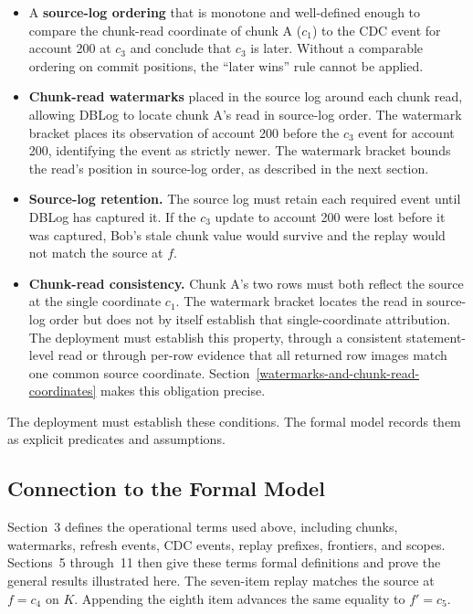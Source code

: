 \documentclass[letterpaper,10pt,twocolumn]{article}
\providecommand{\tightlist}{\setlength{\itemsep}{0pt}\setlength{\parskip}{0pt}}
\begin{document}
\begin{itemize}
\tightlist
\item
  A \textbf{source-log ordering} that is monotone and well-defined
  enough to compare the chunk-read coordinate of chunk A
  ($c_1$) to the CDC event for account 200 at
  $c_3$ and conclude that $c_3$ is later.
  Without a comparable ordering on commit positions, the ``later wins''
  rule cannot be applied.
\item
  \textbf{Chunk-read watermarks} placed in the source log around each
  chunk read, allowing DBLog to locate chunk A's read in source-log order.
  The watermark bracket places its observation of account 200 before the $c_3$
  event for account 200, identifying the event as strictly newer.
  The watermark bracket bounds the read's position in source-log order,
  as described in the next section.
\item
  \textbf{Source-log retention.} The source log must retain each
  required event until DBLog has captured it. If the $c_3$ update to
  account 200 were lost before it was captured, Bob's stale chunk value
  would survive and the replay would not match the source at $f$.
\item
  \textbf{Chunk-read consistency.} Chunk A's two rows must both reflect
  the source at the single coordinate $c_1$. The watermark bracket
  locates the read in source-log order but does not by itself
  establish that single-coordinate attribution. The deployment must
  establish this property, through a consistent statement-level read or
  through per-row evidence that all returned row images match one
  common source coordinate.
  Section~\ref{watermarks-and-chunk-read-coordinates} makes this
  obligation precise.
\end{itemize}

The deployment must establish these conditions. The formal model
records them as explicit predicates and assumptions.

\subsection{Connection to the Formal Model}\label{what-comes-next}

Section~3 defines the operational terms used above, including chunks,
watermarks, refresh events, CDC events, replay prefixes, frontiers, and
scopes. Sections~5 through~11 then give these terms formal definitions
and prove the general results illustrated here. The seven-item replay
matches the source at $f=c_4$ on $K$. Appending the eighth item advances
the same equality to $f'=c_5$.
\end{document}
